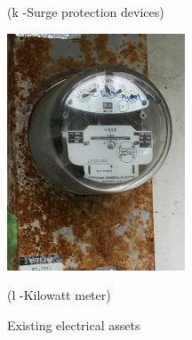 \begin{figure}[!h]
\begin{minipage}[b]{0.22\linewidth}
	\caption*{(k -Surge protection devices)}
\end{minipage}
	\hspace{0.03cm}
\begin{minipage}[b]{0.22\linewidth}
	\includegraphics[width=\textwidth]{figures/fig_ch04_elecaudit_visualinspection_kilowattmeter}
	\caption*{(l -Kilowatt meter)}
\end{minipage}
	\caption{Existing electrical assets}
	\label{fig_ch04_elecaudit_visualinspection}
\end{figure}


